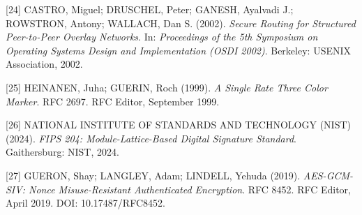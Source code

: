 \documentclass[12pt,a4paper]{article}
\begin{document}
[24] CASTRO, Miguel; DRUSCHEL, Peter; GANESH, Ayalvadi J.; ROWSTRON, Antony; WALLACH, Dan S. (2002).
\textit{Secure Routing for Structured Peer-to-Peer Overlay Networks}.
In: \textit{Proceedings of the 5th Symposium on Operating Systems Design and Implementation (OSDI 2002)}.
Berkeley: USENIX Association, 2002.

[25] HEINANEN, Juha; GUERIN, Roch (1999).
\textit{A Single Rate Three Color Marker}.
RFC 2697. RFC Editor, September 1999.

[26] NATIONAL INSTITUTE OF STANDARDS AND TECHNOLOGY (NIST) (2024).
\textit{FIPS 204: Module-Lattice-Based Digital Signature Standard}. Gaithersburg: NIST, 2024.


[27] GUERON, Shay; LANGLEY, Adam; LINDELL, Yehuda (2019).
\textit{AES-GCM-SIV: Nonce Misuse-Resistant Authenticated Encryption}.
RFC 8452. RFC Editor, April 2019.
DOI: 10.17487/RFC8452.

\endgroup
\end{document}
